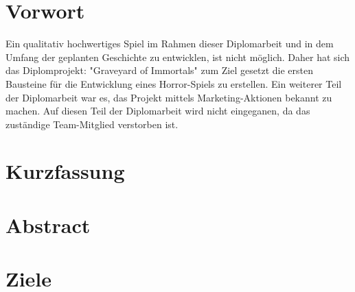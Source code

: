 \usepackage{natbib}

\section{Vorwort}

Ein qualitativ hochwertiges Spiel im Rahmen dieser Diplomarbeit und in dem Umfang der geplanten Geschichte
zu entwicklen, ist nicht möglich.
Daher hat sich das Diplomprojekt: "Graveyard of Immortals" zum Ziel gesetzt die ersten Bausteine für die Entwicklung
eines Horror-Spiels zu erstellen.
Ein weiterer Teil der Diplomarbeit war es, das Projekt mittels Marketing-Aktionen bekannt zu machen.
Auf diesen Teil der Diplomarbeit wird nicht eingeganen, da das zuständige Team-Mitglied verstorben ist.

\section{Kurzfassung}

\section{Abstract}

\section{Ziele}
